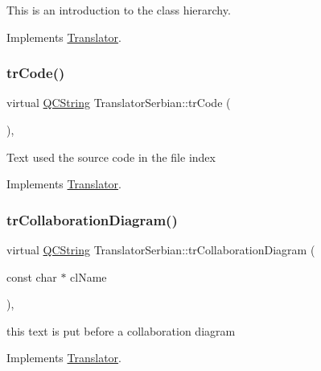 This is an introduction to the class hierarchy. 

Implements \mbox{\hyperlink{class_translator}{Translator}}.

\mbox{\label{class_translator_serbian_ac4b5a25d39be07d2821ba45c01878ece}} 
\subsubsection{\texorpdfstring{trCode()}{trCode()}}
{\footnotesize\ttfamily virtual \mbox{\hyperlink{class_q_c_string}{Q\+C\+String}} Translator\+Serbian\+::tr\+Code (\begin{DoxyParamCaption}{ }\end{DoxyParamCaption})\hspace{0.3cm}{\ttfamily [inline]}, {\ttfamily [virtual]}}

Text used the source code in the file index 

Implements \mbox{\hyperlink{class_translator}{Translator}}.

\mbox{\label{class_translator_serbian_acd6bab03be6bacd4812bfd9d86666285}} 
\subsubsection{\texorpdfstring{trCollaborationDiagram()}{trCollaborationDiagram()}}
{\footnotesize\ttfamily virtual \mbox{\hyperlink{class_q_c_string}{Q\+C\+String}} Translator\+Serbian\+::tr\+Collaboration\+Diagram (\begin{DoxyParamCaption}\item[{const char $\ast$}]{cl\+Name }\end{DoxyParamCaption})\hspace{0.3cm}{\ttfamily [inline]}, {\ttfamily [virtual]}}

this text is put before a collaboration diagram 

Implements \mbox{\hyperlink{class_translator}{Translator}}.

\mbox{\label{class_translator_serbian_a8ecd3c5dc710bc06af57bbeb51eb4dd6}} 
